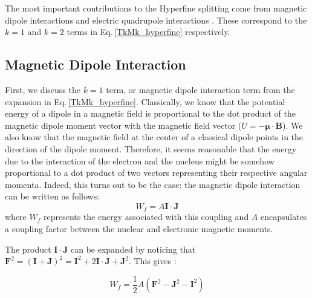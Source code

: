 The most important contributions to the Hyperfine splitting come from magnetic dipole interactions and electric quadrupole interactions \cite{sobelman_spectra}\cite{schwartz_hyperfine_expansion}\cite{cuaMITnotes}. These correspond to the $k=1$ and $k=2$ terms in Eq.\,\ref{TkMk_hyperfine} respectively\cite{experimental_hyperfine_alkali_arimondo}.
\subsection{Magnetic Dipole Interaction}

First, we discuss the $k=1$ term, or magnetic dipole interaction term from the expansion in Eq.\,\ref{TkMk_hyperfine}. Classically, we know that the potential energy of a dipole in a magnetic field is proportional to the dot product of the magnetic dipole moment vector with the magnetic field vector ($U=-\mathbf{\mu}\cdot\mathbf{B}$). We also know that the magnetic field at the center of a classical dipole points in the direction of the dipole moment. Therefore, it seems reasonable that the energy due to the interaction of the electron and the nucleus might be somehow proportional to a dot product of two vectors representing their respective angular momenta. Indeed, this turns out to be the case: the magnetic dipole interaction can be written as follows\cite{sobelman_spectra}: 
\begin{equation}\label{IdotJ}
W_f=A\mathbf{I}\cdot\mathbf{J}
\end{equation}
where $W_f$ represents the energy associated with this coupling and $A$ encapsulates a coupling factor between the nuclear and electronic magnetic moments. 

The product $\mathbf{I}\cdot\mathbf{J}$ can be expanded by noticing that $\mathbf{F}^2=(\mathbf{I}+\mathbf{J})^2=\mathbf{I}^2+2 \mathbf{I}\cdot\mathbf{J}+\mathbf{J}^2$. This gives \cite{cuaMITnotes}\cite{sobelman_spectra}: 

\begin{equation}\label{Wf_dot_product}
W_f=\frac{1}{2}A(\mathbf{F}^2-\mathbf{J}^2-\mathbf{I}^2)
\end{equation}

